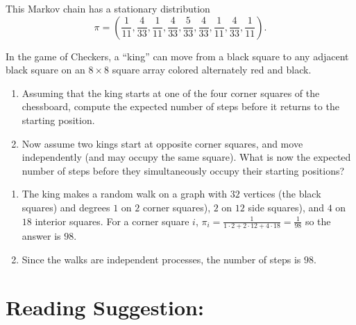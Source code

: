 \documentclass[12pt]{article}
\begin{document}
\begin{solution}
    This Markov chain has a stationary distribution
  \[ \pi = (\frac{1}{11}, \frac{4}{33}, \frac{1}{11}, \frac{4}{33},
    \frac{5}{33}, \frac{4}{33}, \frac{1}{11}, \frac{4}{33}, \frac{1}{11}).
  \]
\end{solution}

\begin{exercise}
  In the game of Checkers, a ``king'' can move from a black
  square to any adjacent black square on an $8 \times 8$ square array
  colored alternately red and black.
    \begin{enumerate}[label=(\alpha*)]
  \item Assuming
that the king starts at one of the four corner squares of the chessboard, compute the expected
number of steps before it returns to the starting position. 
\item  Now assume two kings 
start at opposite corner squares, and move independently (and may
occupy the same square). What is now the expected number of
steps before they simultaneously occupy their starting positions? 
  \end{enumerate}
\end{exercise}
\begin{solution}
  \begin{enumerate}[label=(\alpha*)]
  \item The king makes a random walk on a graph with $32$ vertices (the
    black squares) and degrees $1$ on $2$ corner squares), $2$ on
 $12$ side squares), and $4$ on $18$ interior squares. For a corner
 square $i$, $\pi_i = \frac{1}{1 \cdot 2+ 2 \cdot 12 + 4 \cdot 18} = \frac{1}{98}$
so the answer is $98$.
\item Since the walks are independent processes, the number of steps
  is $98$.
  \end{enumerate}
\end{solution}

\hr

\section*{Reading Suggestion:}



\end{document}

